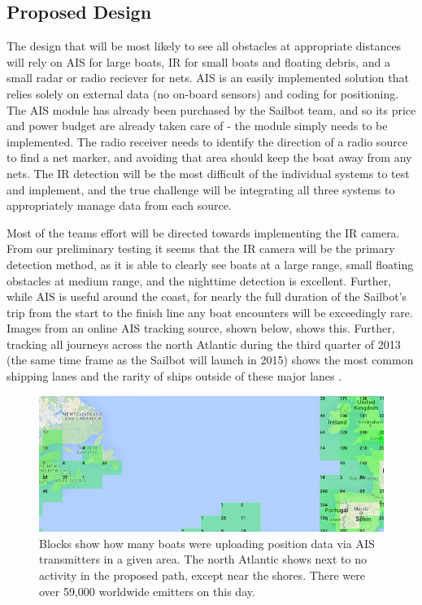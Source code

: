 \subsection{\label{sec:method:proposed-design}Proposed Design}
The design that will be most likely to see all obstacles at appropriate distances will rely on AIS for large boats, IR for small boats and floating debris, and  a small radar or radio reciever for nets. AIS is an easily implemented solution that relies solely on external data (no on-board sensors) and coding for positioning. The AIS module has already been purchased by the Sailbot team, and so its price and power budget are already taken care of - the module simply needs to be implemented. The radio receiver needs to identify the direction of a radio source to find a net marker, and avoiding that area should keep the boat away from any nets. The IR detection will be the most difficult of the individual systems to test and implement, and the true challenge will be integrating all three systems to appropriately manage data from each source.

Most of the teams effort will be directed towards implementing the IR camera. From our preliminary testing it seems that the IR camera will be the primary detection method, as it is able to clearly see boats at a large range, small floating obstacles at medium range, and the nighttime detection is excellent. Further, while AIS is useful around the coast, for nearly the full duration of the Sailbot's trip from the start to the finish line any boat encounters will be exceedingly rare. Images from an online AIS tracking source, shown below, shows this. Further, tracking all journeys across the north Atlantic during the third quarter of 2013 (the same time frame as the Sailbot will launch in 2015) shows the most common shipping lanes and the rarity of ships outside of these major lanes \cite{marine-traffic}.

\begin{figure}
\includegraphics[width=120mm,natwidth=540,natheight=459]{"./image/AIS_emitters_north_atlantic"}
\caption[All AIS emitters in the North Atlantic on Wednesday, November 26 2014.]{\label{fig:ais-emitters}Blocks show how many boats were uploading position data via AIS transmitters in a given area. The north Atlantic shows next to no activity in the proposed path, except near the shores. There were over 59,000 worldwide emitters on this day.}
\end{figure}

